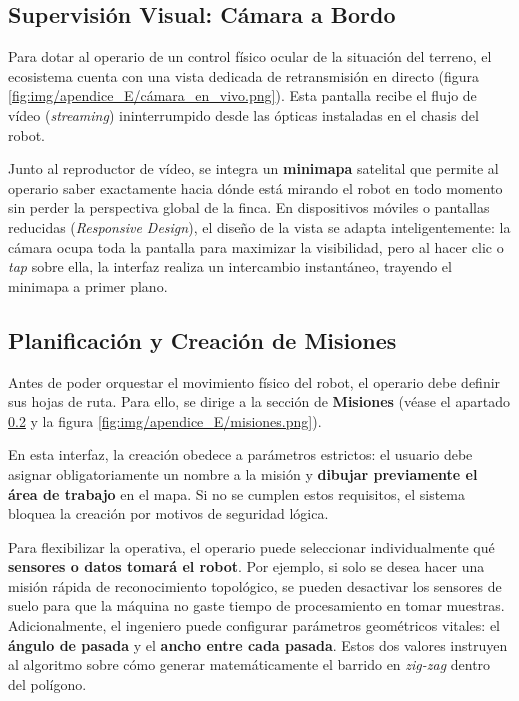\subsection{Supervisión Visual: Cámara a Bordo}
Para dotar al operario de un control físico ocular de la situación del terreno, el ecosistema cuenta con una vista dedicada de retransmisión en directo (figura \ref{fig:img/apendice_E/cámara_en_vivo.png}). Esta pantalla recibe el flujo de vídeo (\textit{streaming}) ininterrumpido desde las ópticas instaladas en el chasis del robot.


Junto al reproductor de vídeo, se integra un \textbf{minimapa} satelital que permite al operario saber exactamente hacia dónde está mirando el robot en todo momento sin perder la perspectiva global de la finca. En dispositivos móviles o pantallas reducidas (\textit{Responsive Design}), el diseño de la vista se adapta inteligentemente: la cámara ocupa toda la pantalla para maximizar la visibilidad, pero al hacer clic o \textit{tap} sobre ella, la interfaz realiza un intercambio instantáneo, trayendo el minimapa a primer plano.

\subsection{Planificación y Creación de Misiones}\label{sec:misiones}
Antes de poder orquestar el movimiento físico del robot, el operario debe definir sus hojas de ruta. Para ello, se dirige a la sección de \textbf{Misiones} (véase el apartado \ref{sec:misiones} y la figura \ref{fig:img/apendice_E/misiones.png}). 


En esta interfaz, la creación obedece a parámetros estrictos: el usuario debe asignar obligatoriamente un nombre a la misión y \textbf{dibujar previamente el área de trabajo} en el mapa. Si no se cumplen estos requisitos, el sistema bloquea la creación por motivos de seguridad lógica. 

Para flexibilizar la operativa, el operario puede seleccionar individualmente qué \textbf{sensores o datos tomará el robot}. Por ejemplo, si solo se desea hacer una misión rápida de reconocimiento topológico, se pueden desactivar los sensores de suelo para que la máquina no gaste tiempo de procesamiento en tomar muestras. Adicionalmente, el ingeniero puede configurar parámetros geométricos vitales: el \textbf{ángulo de pasada} y el \textbf{ancho entre cada pasada}. Estos dos valores instruyen al algoritmo sobre cómo generar matemáticamente el barrido en \textit{zig-zag} dentro del polígono.

